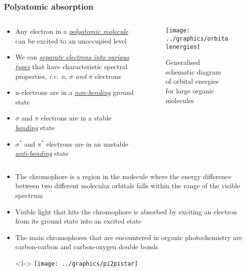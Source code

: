 \documentclass[a4paper,12pt,titlepage]{article}
\begin{document}
\begin{frame}
\frametitle{Polyatomic absorption}
\begin{columns}[onlytextwidth,T]
\begin{column}{.6\textwidth}
\begin{itemize}[<+->]
\item Any electron in a \emph{\underline{polyatomic molecule}} can be excited to an unoccupied level
\item We can \emph{\underline{separate electrons into various types}} that have characteristic spectral properties, \textit{i.e. n, \(\sigma\) and \(\pi\)} electrons
\item n-electrons are in a \emph{\underline{non-bonding}} ground state
\item \(\sigma\) and \(\pi\) electrons are in a stable \emph{\underline{bonding}} state
\item \(\sigma^*\) and \(\pi^*\) electrons are in an unstable \emph{\underline{anti-bonding}} state
\end{itemize}
\end{column}
\begin{column}{.4\textwidth}
\begin{figure}[h!]
\texttt{[image: ../graphics/orbitalenergies]}
\caption{Generalised schematic diagram of orbital energies for large organic molecules}
\end{figure}
\end{column}
\end{columns}
\end{frame}

\begin{frame}[<+->]
\begin{itemize}
\item The {\color{red} chromophore} is a region in the molecule where the energy difference between two different molecular orbitals falls within the range of the visible spectrum
\item Visible light that hits the chromophore is absorbed by exciting an electron from its ground state into an excited state
\item The main chromophores that are encountered in organic photochemistry are {\color{red} carbon-carbon} and {\color{red} carbon-oxygen} double bonds
\item[]<1-> \texttt{[image: ../graphics/pi2pistar]}
\end{itemize}
\end{frame}
\end{document}
